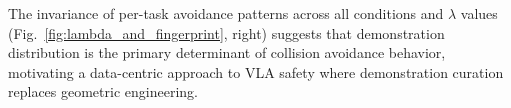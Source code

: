 The invariance of per-task avoidance patterns across all conditions and $\lambda$ values (Fig.~\ref{fig:lambda_and_fingerprint}, right) suggests that demonstration distribution is the primary determinant of collision avoidance behavior, motivating a data-centric approach to VLA safety where demonstration curation replaces geometric engineering.

